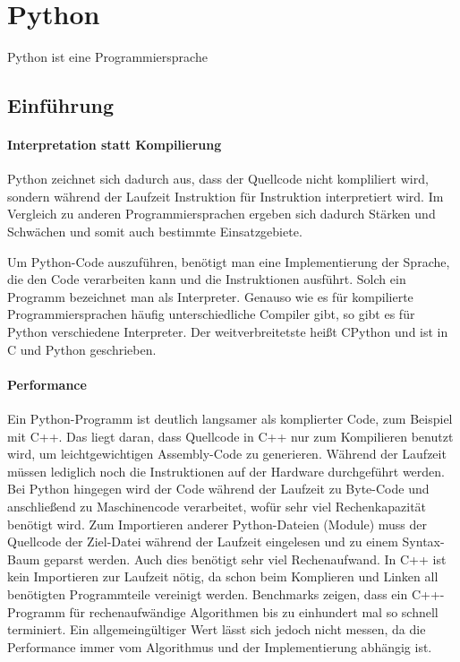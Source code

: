 \section{Python}
	Python ist eine Programmiersprache 
	
	\subsection{Einführung}
		\paragraph{Interpretation statt Kompilierung} Python zeichnet sich dadurch aus, dass der Quellcode nicht kompliliert wird, sondern während der Laufzeit Instruktion für Instruktion interpretiert wird. Im Vergleich zu anderen Programmiersprachen ergeben sich dadurch Stärken und Schwächen und somit auch bestimmte Einsatzgebiete. 
		
		Um Python-Code auszuführen, benötigt man eine Implementierung der Sprache, die den Code verarbeiten kann und die Instruktionen ausführt. Solch ein Programm bezeichnet man als Interpreter. Genauso wie es für kompilierte Programmiersprachen häufig unterschiedliche Compiler gibt, so gibt es für Python verschiedene Interpreter. Der weitverbreitetste heißt CPython und ist in C und Python geschrieben. \cite[vgl.][S. 25]{python2014brochure}
		
		\paragraph{Performance} Ein Python-Programm ist deutlich langsamer als komplierter Code, zum Beispiel mit C++. Das liegt daran, dass Quellcode in C++ nur zum Kompilieren benutzt wird, um leichtgewichtigen Assembly-Code zu generieren. Während der Laufzeit müssen lediglich noch die Instruktionen auf der Hardware durchgeführt werden.
		Bei Python hingegen wird der Code während der Laufzeit zu Byte-Code und anschließend zu Maschinencode verarbeitet, wofür sehr viel Rechenkapazität benötigt wird. Zum Importieren anderer Python-Dateien (Module) muss der Quellcode der Ziel-Datei während der Laufzeit eingelesen und zu einem Syntax-Baum geparst werden. Auch dies benötigt sehr viel Rechenaufwand. In C++ ist kein Importieren zur Laufzeit nötig, da schon beim Komplieren und Linken all benötigten Programmteile vereinigt werden. Benchmarks zeigen, dass ein C++-Programm für rechenaufwändige Algorithmen bis zu einhundert mal so schnell terminiert. Ein allgemeingültiger Wert lässt sich jedoch nicht messen, da die Performance immer vom Algorithmus und der Implementierung abhängig ist. \cite[vgl.][]{banchmarkgame2022cpppython}
		
